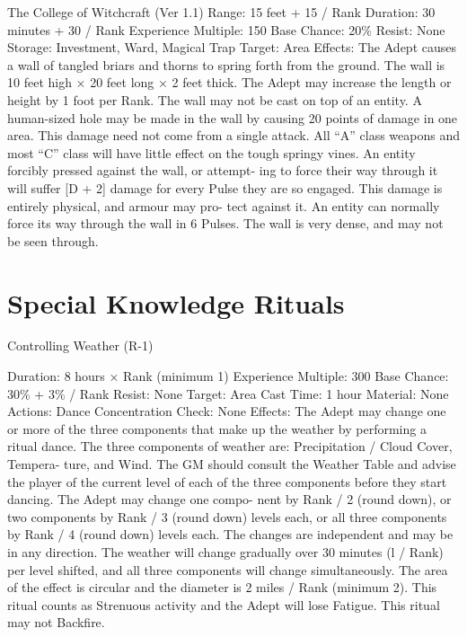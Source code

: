 \begin{Chapter}{The College of Witchcraft (Ver 1.1)}
Range: 15 feet + 15 / Rank 
Duration: 30 minutes + 30 / Rank 
Experience Multiple: 150 
Base Chance: 20\% 
Resist: None 
Storage: Investment, Ward, Magical Trap 
Target: Area 
Effects:  The  Adept  causes  a  wall  of  tangled  briars 
and  thorns  to  spring  forth  from  the  ground.  The 
wall  is  10  feet  high  ×  20  feet  long  ×  2  feet  thick. 
The  Adept  may  increase  the  length  or  height by  1 
foot per Rank. The wall may not be cast on top of 
an entity. A human-sized hole may be made in the 
wall  by  causing  20  points  of  damage  in  one  area. 
This  damage  need  not  come  from  a  single  attack. 
All  “A”  class  weapons  and  most  “C”  class  will 
have  little  effect  on  the  tough  springy  vines.  An 
entity forcibly pressed against the wall, or attempt-
ing to force their way through it will suffer [D + 2] 
damage  for  every  Pulse  they  are  so  engaged.  This 
damage  is  entirely  physical,  and  armour  may  pro-
tect against it. An entity can normally force its way 
through  the  wall  in  6  Pulses.  The  wall  is  very 
dense, and may not be seen through. 


\section{Special Knowledge Rituals}

Controlling Weather (R-1) 

Duration: 8 hours × Rank (minimum 1) 
Experience Multiple: 300 
Base Chance: 30\% + 3\% / Rank 
Resist: None 
Target: Area 
Cast Time: 1 hour 
Material: None 
Actions: Dance 
Concentration Check: None 
Effects: The Adept may change one or more of the 
three  components  that  make  up  the  weather  by 
performing a ritual dance. The three components of 
weather are: Precipitation / Cloud Cover, Tempera-
ture,  and  Wind.  The  GM  should  consult  the 
Weather Table and advise the player of the current 
level  of  each  of  the  three  components  before  they 
start  dancing.  The  Adept  may  change  one  compo-
nent by Rank / 2 (round down), or two components 
by Rank / 3 (round down) levels each, or all three 
components by Rank / 4 (round down) levels each. 
The  changes  are  independent  and  may  be  in  any 
direction.  The  weather  will  change  gradually  over 
30 minutes (l / Rank) per level shifted, and all three 
components  will  change  simultaneously.  The  area 
of the effect is circular and the diameter is 2 miles / 
Rank (minimum 2). This ritual counts as Strenuous 
activity and the Adept will lose Fatigue. This ritual 
may not Backfire. 


\end{Chapter}
